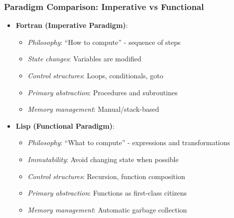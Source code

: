 \documentclass{beamer}
\begin{document}
\begin{frame}[t]
\frametitle{Paradigm Comparison: Imperative vs Functional}
\begin{itemize}
    \item \textbf{Fortran (Imperative Paradigm)}:
    \begin{itemize}
        \item \textit{Philosophy}: ``How to compute'' - sequence of steps
        \item \textit{State changes}: Variables are modified
        \item \textit{Control structures}: Loops, conditionals, goto
        \item \textit{Primary abstraction}: Procedures and subroutines
        \item \textit{Memory management}: Manual/stack-based
    \end{itemize}
    
    \item \textbf{Lisp (Functional Paradigm)}:
    \begin{itemize}
        \item \textit{Philosophy}: ``What to compute'' - expressions and transformations
        \item \textit{Immutability}: Avoid changing state when possible
        \item \textit{Control structures}: Recursion, function composition
        \item \textit{Primary abstraction}: Functions as first-class citizens
        \item \textit{Memory management}: Automatic garbage collection
    \end{itemize}
\end{itemize}
\end{frame}
\end{document}

